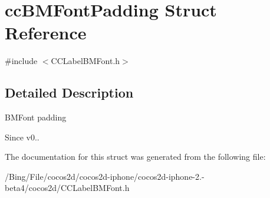 \hypertarget{structcc_b_m_font_padding}{\section{cc\-B\-M\-Font\-Padding Struct Reference}
\label{structcc_b_m_font_padding}
}


{\ttfamily \#include $<$C\-C\-Label\-B\-M\-Font.\-h$>$}



\subsection{Detailed Description}
B\-M\-Font padding \begin{DoxySince}{Since}
v0.. 
\end{DoxySince}


The documentation for this struct was generated from the following file\-:\begin{DoxyCompactItemize}
\item 
/\-Bing/\-File/cocos2d/cocos2d-\/iphone/cocos2d-\/iphone-\/2.-\/beta4/cocos2d/C\-C\-Label\-B\-M\-Font.\-h\end{DoxyCompactItemize}
